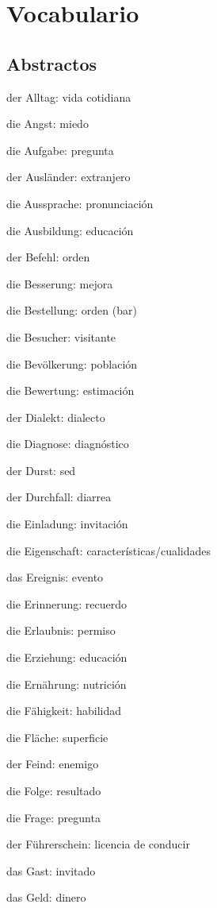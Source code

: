 \chapter{Vocabulario}
\section{Abstractos}
\begin{multicols}{2}
\begin{myitemize}
\item der Alltag: vida cotidiana
\item die Angst: miedo
\item die Aufgabe: pregunta
\item der Ausländer: extranjero
\item die Aussprache: pronunciación
\item die Ausbildung: educación
\item der Befehl: orden
\item die Besserung: mejora
\item die Bestellung: orden (bar)
\item die Besucher: visitante
\item die Bevölkerung: población
\item die Bewertung: estimación
\item der Dialekt: dialecto
\item die Diagnose: diagnóstico
\item der Durst: sed
\item der Durchfall: diarrea
\item die Einladung: invitación
\item die Eigenschaft: características/cualidades
\item das Ereignis: evento
\item die Erinnerung: recuerdo
\item die Erlaubnis: permiso
\item die Erziehung: educación
\item die Ernährung: nutrición
\item die Fähigkeit: habilidad
\item die Fläche: superficie
\item der Feind: enemigo
\item die Folge: resultado
\item die Frage: pregunta
\item der Führerschein: licencia de conducir
\item das Gast: invitado
\item das Geld: dinero

\end{myitemize}
\end{multicols}
